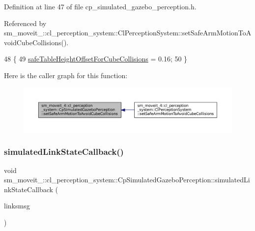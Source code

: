 Definition at line 47 of file cp\+\_\+simulated\+\_\+gazebo\+\_\+perception.\+h.



Referenced by sm\+\_\+moveit\+\_\+::cl\+\_\+perception\+\_\+system\+::\+Cl\+Perception\+System\+::set\+Safe\+Arm\+Motion\+To\+Avoid\+Cube\+Collisions().


\begin{DoxyCode}
48             \{
49                  \hyperlink{classsm__moveit__4_1_1cl__perception__system_1_1CpSimulatedGazeboPerception_a6b6bafbddde1f72c81bf54aa75872151}{safeTableHeightOffsetForCubeCollisions} = 0.16;
50             \}
\end{DoxyCode}
Here is the caller graph for this function\+:
\nopagebreak
\begin{figure}[H]
\begin{center}
\leavevmode
\includegraphics[width=350pt]{classsm__moveit__4_1_1cl__perception__system_1_1CpSimulatedGazeboPerception_af42b5a4e239fcac98a222c34115c9bc0_icgraph}
\end{center}
\end{figure}
\mbox{\label{classsm__moveit__4_1_1cl__perception__system_1_1CpSimulatedGazeboPerception_a7914ffd20518c866a8a1e11254589d12}} 
\subsubsection{\texorpdfstring{simulated\+Link\+State\+Callback()}{simulatedLinkStateCallback()}}
{\footnotesize\ttfamily void sm\+\_\+moveit\+\_\+::cl\+\_\+perception\+\_\+system\+::\+Cp\+Simulated\+Gazebo\+Perception\+::simulated\+Link\+State\+Callback (\begin{DoxyParamCaption}\item[{const gazebo\+\_\+msgs\+::\+Link\+States \&}]{linksmsg }\end{DoxyParamCaption})\hspace{0.3cm}{\ttfamily [inline]}}



